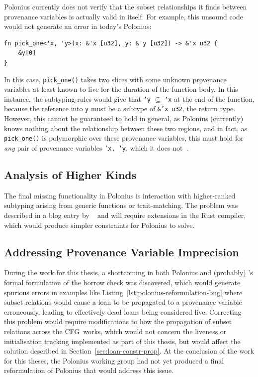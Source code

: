 \documentclass[11pt,a4paper,twoside,openany]{report}
\newcommand{\InRust}[1]{\texttt{#1}}
\begin{document}
Polonius currently does not verify that the subset relationships it finds between
provenance variables is actually valid in itself. For example, this unsound code
would not generate an error in today's Polonius:
\begin{verbatim}
fn pick_one<'x, 'y>(x: &'x [u32], y: &'y [u32]) -> &'x u32 {
    &y[0]
}
\end{verbatim}

In this case, \InRust{pick_one()} takes two slices with some unknown provenance
variables at least known to live for the duration of the function body. In this
instance, the subtyping rules would give that \InRust{'y} $\subseteq$
\InRust{'x} at the end of the function, because the reference into \InRust{y}
must be a subtype of \InRust{&'x u32}, the return type. However, this cannot be
guaranteed to hold in general, as Polonius (currently) knows nothing about the
relationship between these two regions, and in fact, as \InRust{pick_one()} is
polymorphic over these provenance variables, this must hold for \emph{any} pair
of provenance variables \InRust{'x, 'y}, which it does
not~\cite{matsakis_polonius_2019-1}.

\subsection{Analysis of Higher Kinds}
\label{sec:missing-features:higher-kinds}

The final missing functionality in Polonius is interaction with higher-ranked
subtyping arising from generic functions or trait-matching. The problem was
described in a blog entry by
\citeauthor{matsakis_polonius_2019}~\cite{matsakis_polonius_2019} and will
require extensions in the Rust compiler, which would produce simpler constraints
for Polonius to solve.

\subsection{Addressing Provenance Variable Imprecision}
\label{sec:missing-features:provenance-variable-equality}

During the work for this thesis, a shortcoming in both Polonius and (probably)
\citeauthor{weiss_oxide:_2019}'s formal formulation of the borrow check was
discovered, which would generate spurious errors in examples like
Listing~\ref{lst:polonius-reformulation-bug} where subset relations would cause
a loan to be propagated to a provenance variable erroneously, leading to
effectively dead loans being considered live. Correcting this problem would
require modifications to how the propagation of subset relations across the
CFG~works, which would not concern the liveness or initialisation tracking
implemented as part of this thesis, but would affect the solution described in
Section~\ref{sec:loan-constr-prop}. At the conclusion of the work for this
theses, the Polonius working group had not yet produced a final reformulation of
Polonius that would address this issue.
\end{document}
